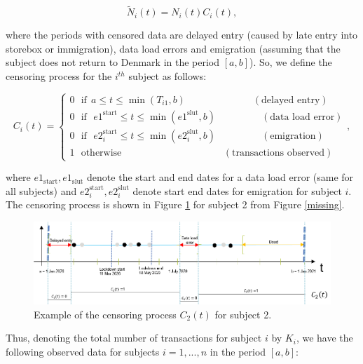 \documentclass[
  11pt,
]{article}
\begin{document}
\[
\tilde{N}_i(t)=N_i(t)C_i(t),
\]

where the periods with censored data are delayed entry (caused by late
entry into storebox or immigration), data load errors and emigration
(assuming that the subject does not return to Denmark in the period
\([a,b]\)). So, we define the censoring process for the \(i^{th}\)
subject as follows:

\[
C_i(t)= \begin{cases}
0 \ \ \ \text{if} \ \ a \leq t \leq \min(T_{i1}, b) \ \ \ \ \ \ \ \ \ \ \ \ \ \ \ \ \ \ \ \ \ \ \ \ \ \ \ \ \ \ \ (\text{delayed entry}) \\
0 \ \ \ \text{if} \ \ \ e1^{\text{start}} \leq t \leq \min(e1^{\text{slut}},b) \ \ \ \ \ \ \ \ \ \ \ \ \ \ \ \ \ \ \ \ \ (\text{data load error}) \\
0 \ \ \ \text{if} \ \ \ e2_i^{\text{start}} \leq t \leq \min(e2_i^{\text{slut}},b) \ \ \ \ \ \ \ \ \ \ \ \ \ \ \ \ \ \ \ \ \ (\text{emigration}) \\
1 \ \ \ \text{otherwise} \ \ \ \ \ \ \ \ \ \ \ \ \ \ \ \ \ \ \ \ \ \ \ \ \ \ \ \ \ \ \ \ \ \ \ \ \ \ \ \ \ \ \ \ \ \ \ (\text{transactions observed})
\end{cases},
\]

where \(e1_{\text{start}}, e1_{\text{slut}}\) denote the start and end
dates for a data load error (same for all subjects) and
\(e2_i^{\text{start}}, e2_i^{\text{slut}}\) denote start end dates for
emigration for subject \(i\). The censoring process is shown in Figure
\ref{censoring} for subject 2 from Figure \ref{missing}.

\begin{center}
\begin{figure}
\includegraphics[]{Censoring}
\caption{Example of the censoring process $C_2(t)$ for subject 2.}
\label{censoring}
\end{figure}
\end{center}

Thus, denoting the total number of transactions for subject \(i\) by
\(K_i\), we have the following observed data for subjects \(i=1,...,n\)
in the period \([a,b]\):
\end{document}
